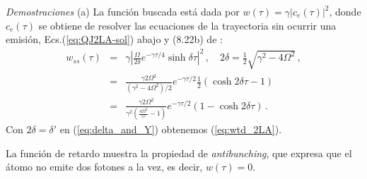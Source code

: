 \documentclass[twocolumn,aps,eqsecnum,showkeys,amsmath]{revtex4}
\begin{document}
\textit{Demostraciones}
\newline (a) La funci\'on buscada est\'a dada por 
$w(\tau) = \gamma |c_e(\tau)|^2$, donde $c_e(\tau)$ se obtiene de 
resolver las ecuaciones de la trayectoria sin ocurrir una emisi\'on, 
Ecs.(\ref{eq:QJ2LA-sol}) abajo y (8.22b) de \cite{Carmichael93}:
%
\begin{eqnarray*}
w_{ss}(\tau) &=& \gamma \left|  \frac{\Omega}{2\delta} e^{-\gamma \tau/4} 
	\sinh{\delta \tau} \right|^2 \,, 	\quad 
	2\delta = \frac{1}{2} \sqrt{\gamma^2 -4\Omega^2} \,, \\
%
&=& \frac{\gamma 2\Omega^2}{(\gamma^2 -4\Omega^2)/2} 
	e^{-\gamma \tau/2} \frac{1}{2} \left( \cosh{2\delta \tau}  -1 \right) \\
&=&  \frac{\gamma 2\Omega^2}{\gamma^2 (\frac{4\Omega^2}{\gamma^2} -1)}  
	e^{-\gamma \tau/2}  \left( 1- \cosh{2\delta \tau}  \right)  \,. 
\end{eqnarray*}
Con $2\delta = \delta'$ en (\ref{eq:delta_and_Y}) obtenemos 
(\ref{eq:wtd_2LA}).  

La funci\'on de retardo muestra la propiedad de \textit{antibunching}, 
que expresa que el \'atomo no emite dos fotones a la vez, es decir, 
$w(\tau) =0$. 
\end{document}
